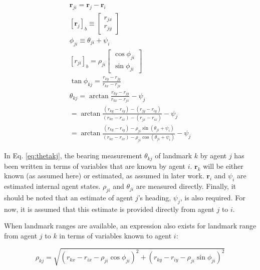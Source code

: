 \documentclass{aiaa-tc}
\newcommand{\br}[2]{[#1]_{#2}} %
\newcommand{\B}[1]{\textbf{#1}} %
\begin{document}
\begin{align}
\B{r}_{ji} = \B{r}_{j} - \B{r}_{i} \\
\br{\B{r}_{j}}{b} \equiv \begin{bmatrix}
r_{jx} \\
r_{jy}
\end{bmatrix} \\
\phi_{ji} \equiv \theta_{ji} + \psi_i \\
\br{r_{ji}}{b} = \rho_{ji}\begin{bmatrix}
\cos{\phi_{ji}}\\
\sin{\phi_{ji}}
\end{bmatrix}\\
\tan{\phi_{kj}} = \frac{r_{ky}-r_{jy}}{r_{kx}-r_{jx}}\\
\theta_{kj} = \arctan{\frac{r_{ky}-r_{jy}}{r_{kx}-r_{jx}}} - \psi_j\\
 = \arctan{ \frac{(r_{ky}-r_{iy}) - (r_{jy}-r_{iy})}{(r_{kx}-r_{ix}) - (r_{jx}-r_{ix})} } - \psi_j \\
 = \arctan{ \frac{(r_{ky}-r_{iy}) - \rho_{ji}\sin{ (\theta_{ji} + \psi_i )}}{(r_{kx}-r_{ix}) - \rho_{ji}\cos{(\theta_{ji} + \psi_i )}} } - \psi_j
 \label{eq:thetakj}
\end{align}

In Eq. \ref{eq:thetakj}, the bearing measurement $\theta_{kj}$ of landmark $k$ by agent $j$ has been written in terms of variables that are known by agent $i$. $\B{r}_{k}$ will be either known (as assumed here) or estimated, as assumed in later work. $\B{r}_i$ and $\psi_i$ are estimated internal agent states. $\rho_{ji}$ and $\theta_{ji}$ are measured directly. Finally, it should be noted that an estimate of agent $j$'s heading, $\psi_j$, is also required. For now, it is assumed that this estimate is provided directly from agent $j$ to $i$.

When landmark ranges are available, an expression also exists for landmark range from agent $j$ to $k$ in terms of variables known to agent $i$:

\begin{equation}
\rho_{kj} = \sqrt{ (r_{kx}-r_{ix}-\rho_{ji}\cos{\phi_{ji}})^2 + (r_{ky}-r_{iy}-\rho_{ji}\sin{\phi_{ji}})^2 }
\label{eq:rhokj}
\end{equation}
\end{document}
